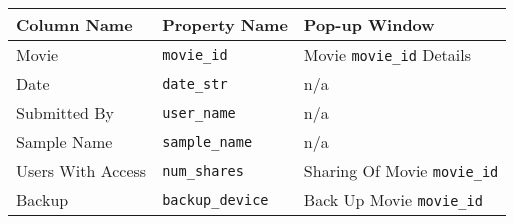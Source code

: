 \begin{tabularx}{\textwidth}{l|l|X}
\toprule
 Column Name       & Property Name   & Pop-up Window             \\
\midrule
 Movie             & \texttt{movie\_id}        & Movie \texttt{movie\_id} Details    \\
 Date              & \texttt{date\_str}        & n/a                       \\
 Submitted By      & \texttt{user\_name}       & n/a                       \\
 Sample Name       & \texttt{sample\_name}     & n/a                       \\
 Users With Access & \texttt{num\_shares}      & Sharing Of Movie \texttt{movie\_id} \\
 Backup            & \texttt{backup\_device}   & Back Up Movie \texttt{movie\_id}    \\
\bottomrule
\end{tabularx}